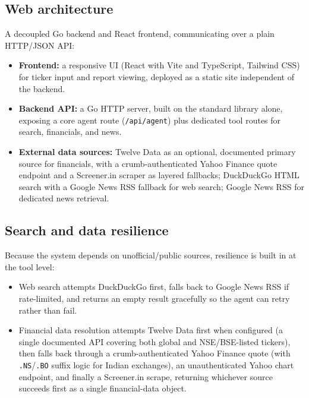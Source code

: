 \documentclass[11pt,a4paper]{article}
\begin{document}
\subsection{Web architecture}
A decoupled Go backend and React frontend, communicating over a plain HTTP/JSON API:
\begin{itemize}[leftmargin=0.7cm]
    \item \textbf{Frontend:} a responsive UI (React with Vite and TypeScript, Tailwind CSS) for ticker input and report viewing, deployed as a static site independent of the backend.
    \item \textbf{Backend API:} a Go HTTP server, built on the standard library alone, exposing a core agent route (\texttt{/api/agent}) plus dedicated tool routes for search, financials, and news.
    \item \textbf{External data sources:} Twelve Data as an optional, documented primary source for financials, with a crumb-authenticated Yahoo Finance quote endpoint and a Screener.in scraper as layered fallbacks; DuckDuckGo HTML search with a Google News RSS fallback for web search; Google News RSS for dedicated news retrieval.
\end{itemize}

\subsection{Search and data resilience}
Because the system depends on unofficial/public sources, resilience is built in at the tool level:
\begin{itemize}[leftmargin=0.7cm]
    \item Web search attempts DuckDuckGo first, falls back to Google News RSS if rate-limited, and returns an empty result gracefully so the agent can retry rather than fail.
    \item Financial data resolution attempts Twelve Data first when configured (a single documented API covering both global and NSE/BSE-listed tickers), then falls back through a crumb-authenticated Yahoo Finance quote (with \texttt{.NS}/\texttt{.BO} suffix logic for Indian exchanges), an unauthenticated Yahoo chart endpoint, and finally a Screener.in scrape, returning whichever source succeeds first as a single financial-data object.
\end{itemize}
\end{document}
